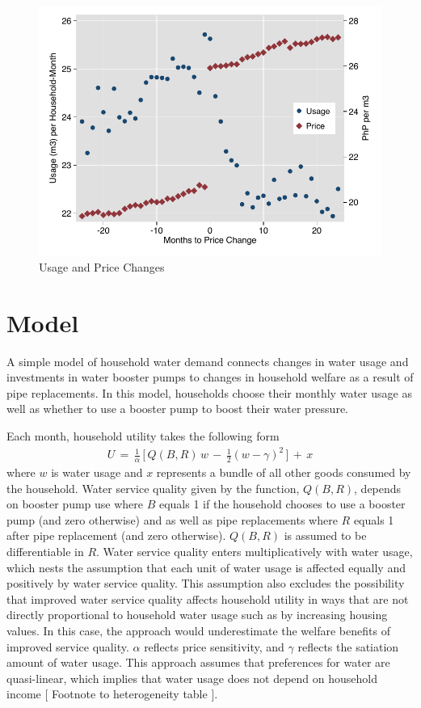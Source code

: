 \documentclass[12pt,table]{article}
\begin{document}
\begin{figure}
\begin{center}
\caption{Usage and Price Changes}\label{figure:usagepricechanges}
\includegraphics[scale=1]{tables/r_to_s_only_graph.pdf}
\end{center}
\end{figure}

\section{Model}

A simple model of household water demand connects changes in water usage and investments in water booster pumps to changes in household welfare as a result of pipe replacements.  In this model, households choose their monthly water usage as well as whether to use a booster pump to boost their water pressure.  

Each month, household utility takes the following form
\begin{align}
\label{eq:utility}
U\,=\,\frac{1}{\alpha} \, \Big[ \,  Q(B,R) \,  w  \, -\, \frac{1}{2}(w - \gamma)^2 \, \Big] \, + \, x 
\end{align}
where $w$ is water usage and $x$ represents a bundle of all other goods consumed by the household.  Water service quality given by the function, $Q(B,R)$, depends on booster pump use where $B$ equals 1 if the household chooses to use a booster pump (and zero otherwise) and as well as pipe replacements where $R$ equals 1 after pipe replacement (and zero otherwise).  $Q(B,R)$ is assumed to be differentiable in $R$.  Water service quality enters multiplicatively with water usage, which nests the assumption that each unit of water usage is affected equally and positively by water service quality.  This assumption also excludes the possibility that improved water service quality affects household utility in ways that are not directly proportional to household water usage such as by increasing housing values.  In this case, the approach would underestimate the welfare benefits of improved service quality.  $\alpha$ reflects price sensitivity, and $\gamma$ reflects the satiation amount of water usage.  This approach assumes that preferences for water are quasi-linear, which implies that water usage does not depend on household income [ Footnote to heterogeneity table ].  
\end{document}
